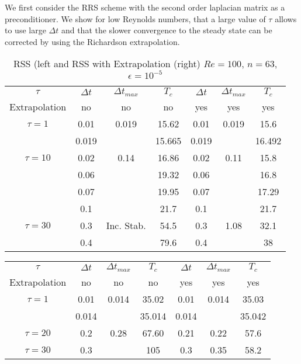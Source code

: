{We first consider the RRS scheme with the second order laplacian matrix  as a preconditioner. We show for low Reynolds numbers, that a large value of $\tau$ allows to use large $\Delta t$ and that the slower convergence to the steady state can be corrected by using the Richardson extrapolation.
\begin{table}[ht!]
\begin{center}
\begin{tabular}{|c||c|c|c||c|c|c|}
\hline
$\tau$ & $\Delta t$ & $\Delta t_{max}$ & $T_c$ & $\Delta t$ & $\Delta t_{max}$ & $T_c$\\
Extrapolation & no  & no  & no  & yes& yes& yes\\
\hline 
\hline 
$\tau = 1$ & 0.01 & 0.019 & 15.62 & 0.01 & 0.019 & 15.6 \\ 
\hline
              & 0.019 &    & 15.665 & 0.019& & 16.492 \\
\hline 
\hline
$\tau = 10$&  0.02 & 0.14 & 16.86 & 0.02 & 0.11 & 15.8 \\ 
\hline 
  & 0.06 &   & 19.32 & 0.06 &   & 16.8 \\ 
\hline 
  & 0.07 &   & 19.95 & 0.07 &   & 17.29 \\ 
\hline 
  & 0.1 &   & 21.7  & 0.1 &   & 21.7 \\  
\hline 
\hline
$\tau = 30$    & 0.3 & Inc. Stab. & 54.5 & 0.3 &  1.08 & 32.1 \\ 
\hline 
  & 0.4 &   & 79.6 & 0.4 &   & 38 \\ 
\hline 
\hline
\end{tabular}
\caption{RSS (left and RSS with  Extrapolation (right) $Re=100$, $n=63$, $\epsilon=10^{-5}$}
\label{tab1}
\end{center}
\end{table}
\begin{table}[ht!]
\begin{center}
\begin{tabular}{|c||c|c|c||c|c|c|}
\hline
$\tau$ & $\Delta t$ & $\Delta t_{max}$ & $T_c$ & $\Delta t$ & $\Delta t_{max}$ & $T_c$\\
Extrapolation & no  & no  & no  & yes& yes& yes\\
\hline 
\hline 
$\tau = 1$ & 0.01 & 0.014 & 35.02& 0.01 & 0.014 & 35.03 \\ 
\hline 
  & 0.014 &   & 35.014  & 0.014 &   & 35.042 \\ 
\hline 
\hline
$\tau = 20$   & 0.2 & 0.28& 67.60 & 0.21 & 0.22 & 57.6 \\ 
\hline 
\hline
$\tau = 30$    & 0.3 &   & 105 & 0.3 &0.35   & 58.2 \\ 

\end{tabular}
\end{center}
\end{table}}
